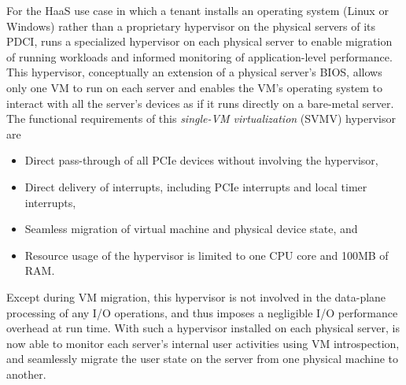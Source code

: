 For the HaaS use case in which a tenant installs an operating system (Linux or Windows) rather than a proprietary hypervisor on the physical servers of its PDCI, \na runs a specialized hypervisor on each physical server to enable migration of running workloads and informed monitoring of application-level performance. This hypervisor, conceptually an extension of a physical server's BIOS, allows only one VM to run on each server and enables the VM's operating system to interact with all the server's devices as if it runs directly on a bare-metal server.
The functional requirements of this {\em single-VM virtualization} (SVMV) hypervisor are
\begin{itemize} 
\setlength\itemsep{-0.04in}
\item Direct pass-through of all PCIe devices without involving the hypervisor,
\item Direct delivery of interrupts, including PCIe interrupts and local timer interrupts, 
\item Seamless migration of virtual machine and physical device state, and 
\item Resource usage of the hypervisor is limited to one CPU core and 100MB of RAM.
\end{itemize}
Except during VM migration, this hypervisor is not involved in the data-plane processing of any I/O operations, and thus imposes a negligible I/O performance overhead at run time.  
With such a hypervisor installed on each physical server, \na is now able to monitor each server's internal user activities using VM introspection, and seamlessly migrate the user state on the server from one physical machine to another. 

